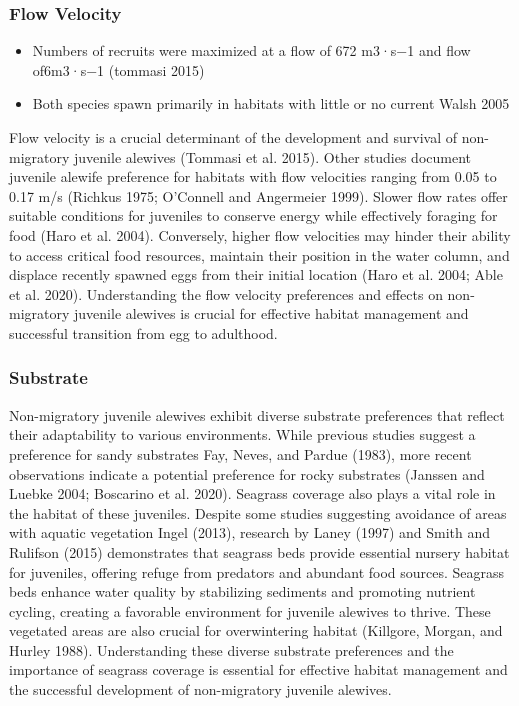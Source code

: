 \documentclass[
]{book}
\providecommand{\tightlist}{%
  \setlength{\itemsep}{0pt}\setlength{\parskip}{0pt}}
\begin{document}
\hypertarget{flow-velocity-1}{%
\subsubsection{Flow Velocity}\label{flow-velocity-1}}

\begin{itemize}
\tightlist
\item
  Numbers of recruits were maximized at a flow of 672 m3·s−1 and flow of6m3·s−1 (tommasi 2015)
\item
  Both species spawn primarily in habitats with little or no current Walsh 2005
\end{itemize}

Flow velocity is a crucial determinant of the development and survival of non-migratory juvenile alewives (Tommasi et al. 2015).
Other studies document juvenile alewife preference for habitats with flow velocities ranging from 0.05 to 0.17 m/s (Richkus 1975; O'Connell and Angermeier 1999).
Slower flow rates offer suitable conditions for juveniles to conserve energy while effectively foraging for food (Haro et al. 2004).
Conversely, higher flow velocities may hinder their ability to access critical food resources, maintain their position in the water column, and displace recently spawned eggs from their initial location (Haro et al. 2004; Able et al. 2020).
Understanding the flow velocity preferences and effects on non-migratory juvenile alewives is crucial for effective habitat management and successful transition from egg to adulthood.

\hypertarget{substrate-1}{%
\subsubsection{Substrate}\label{substrate-1}}

Non-migratory juvenile alewives exhibit diverse substrate preferences that reflect their adaptability to various environments.
While previous studies suggest a preference for sandy substrates Fay, Neves, and Pardue (1983), more recent observations indicate a potential preference for rocky substrates (Janssen and Luebke 2004; Boscarino et al. 2020).
Seagrass coverage also plays a vital role in the habitat of these juveniles.
Despite some studies suggesting avoidance of areas with aquatic vegetation Ingel (2013), research by Laney (1997) and Smith and Rulifson (2015) demonstrates that seagrass beds provide essential nursery habitat for juveniles, offering refuge from predators and abundant food sources.
Seagrass beds enhance water quality by stabilizing sediments and promoting nutrient cycling, creating a favorable environment for juvenile alewives to thrive.
These vegetated areas are also crucial for overwintering habitat (Killgore, Morgan, and Hurley 1988).
Understanding these diverse substrate preferences and the importance of seagrass coverage is essential for effective habitat management and the successful development of non-migratory juvenile alewives.
\end{document}
